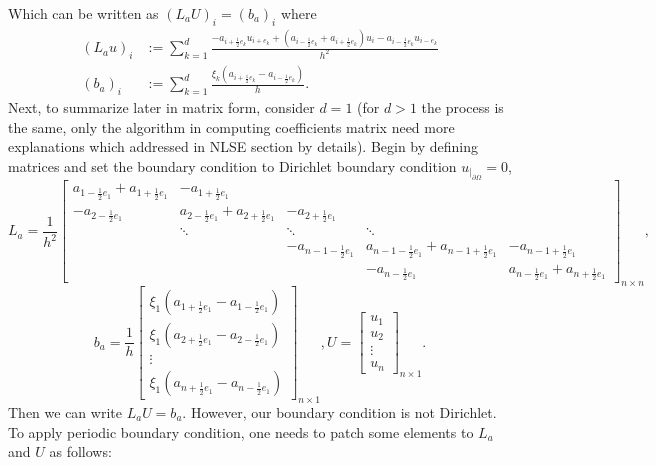 Which can be written as  $(L_a U)_i = (b_a)_i$ where 
\begin{align}
\label{def:L_a}
(L_a u)_i &:= \sum_{k=1}^{d} \frac{-a_{i+\frac{1}{2}e_k} u_{i+e_k} + (a_{i-\frac{1}{2}e_k} + a_{i+\frac{1}{2}e_k})u_i - a_{i-\frac{1}{2}e_k} u_{i-e_k} }{h^2}\\
\label{def:b_a}
(b_a)_i &:= \sum_{k=1}^{d} \frac{\xi_k (a_{i+\frac{1}{2}e_k} - a_{i-\frac{1}{2}e_k})}{h} .
\end{align}
Next, to summarize later in matrix form, consider $d=1$ (for $d>1$ the process is the same, only the algorithm in computing coefficients matrix need more explanations which addressed in NLSE section by details). Begin by defining matrices and set the boundary condition to Dirichlet boundary condition $u_{\vert_{\partial\Omega}} = 0$, 
\begin{equation*}
L_{a} = \frac{1}{h^2}\begin{bmatrix}
a_{1 - \frac{1}{2}e_{1}} + a_{1 + \frac{1}{2}e_{1}}  &  -a_{1+\frac{1}{2}e_{1}} &  &  &  \\
-a_{2-\frac{1}{2}e_{1}}&a_{2 - \frac{1}{2}e_{1}} + a_{2 + \frac{1}{2}e_{1}}& -a_{2 + \frac{1}{2}e_{1}} & & \\
& \ddots& \ddots &\ddots  &  \\
& & -a_{n-1-\frac{1}{2}e_{1}}&a_{n-1 - \frac{1}{2}e_{1}} + a_{n-1 + \frac{1}{2}e_{1}}&-a_{n-1 + \frac{1}{2}e_{1}}\\
& & & -a_{n-\frac{1}{2}e_{1}} &a_{n-\frac{1}{2}e_{1}} + a_{n+\frac{1}{2}e_{1}}
\end{bmatrix}_{n \times n},
\end{equation*}
\begin{equation*}
b_a = \frac{1}{h}\begin{bmatrix}
\xi_1 (a_{1+\frac{1}{2}e_{1}} - a_{1-\frac{1}{2}e_{1}}) \\
\xi_1 (a_{2+\frac{1}{2}e_{1}} - a_{2-\frac{1}{2}e_{1}}) \\
\vdots \\
\xi_1 (a_{n+\frac{1}{2}e_{1}} - a_{n-\frac{1}{2}e_{1}})
\end{bmatrix}_{n \times 1},
U = \begin{bmatrix}
u_{1} \\
u_{2} \\
\vdots \\
u_{n}
\end{bmatrix}_{n \times 1}.
\end{equation*}
Then we can write $L_a U = b_a$. However, our boundary condition is not Dirichlet. To apply periodic boundary condition, one needs to patch some elements to $L_a$ and $U$ as follows:
